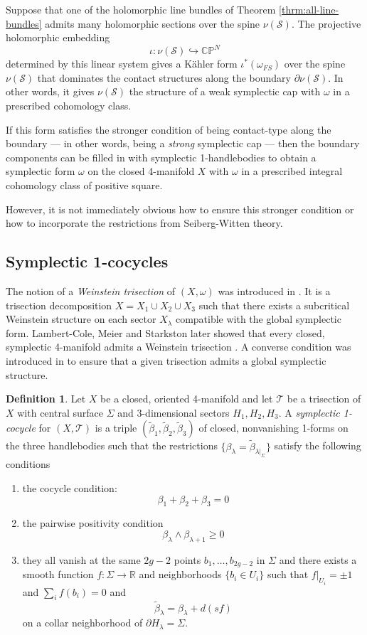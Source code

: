 \documentclass[11pt]{amsart}
\theoremstyle{definition}
\newtheorem{definition}[theorem]{Definition}
\theoremstyle{remark}
\numberwithin{equation}{section}
\newcommand{\betat}{\widetilde{\beta}}
\newcommand{\cT}{\mathcal{T}}
\newcommand{\cS}{\mathcal{S}}
\newcommand{\RR}{\mathbb{R}}
\newcommand{\CP}{\mathbb{CP}}
\newcommand{\del}{\partial}
\begin{document}
Suppose that one of the holomorphic line bundles of Theorem \ref{thrm:all-line-bundles} admits many holomorphic sections over the spine $\nu(\cS)$.  The projective holomorphic embedding 
\[\iota: \nu(\cS) \hookrightarrow \CP^N\]
determined by this linear system gives a K\"ahler form $\iota^*(\omega_{FS})$ over the spine $\nu(\cS)$ that dominates the contact structures along the boundary $\del \nu(\cS)$.  In other words, it gives $\nu(\cS)$ the structure of a weak symplectic cap with $\omega$ in a prescribed cohomology class.  

If this form satisfies the stronger condition of being contact-type along the boundary --- in other words, being a {\it strong} symplectic cap --- then the boundary components can be filled in with symplectic 1-handlebodies to obtain a symplectic form $\omega$ on the closed 4-manifold $X$ with $\omega$ in a prescribed integral cohomology class of positive square.

However, it is not immediately obvious how to ensure this stronger condition or how to incorporate the restrictions from Seiberg-Witten theory.

\subsection{Symplectic 1-cocycles}

The notion of a {\it Weinstein trisection} of $(X,\omega)$ was introduced in \cite{LM-Rational}.  It is a trisection decomposition $X = X_1 \cup X_2 \cup X_3$ such that there exists a subcritical Weinstein structure on each sector $X_{\lambda}$ compatible with the global symplectic form.  Lambert-Cole, Meier and Starkston later showed that every closed, symplectic 4-manifold admits a Weinstein trisection \cite{LMS}.  A converse condition was introduced in \cite{LC-symp-cocycle} to ensure that a given trisection admits a global symplectic structure.

\begin{definition}
\label{def:symp-1-cocycle}
    Let $X$ be a closed, oriented 4-manifold and let $\cT$ be a trisection of $X$ with central surface $\Sigma$ and 3-dimensional sectors $H_1,H_2,H_3$.  A {\it symplectic 1-cocycle} for $(X,\cT)$ is a triple $(\betat_1,\betat_2,\betat_3)$ of closed, nonvanishing 1-forms on the three handlebodies such that the restrictions $\{\beta_{\lambda} = \betat_{\lambda|_{\Sigma}} \}$ satisfy the following conditions 
    \begin{enumerate}
        \item the cocycle condition:
        \[ \beta_1 + \beta_2 + \beta_3 = 0\]
        \item the pairwise positivity condition
        \[\beta_{\lambda} \wedge \beta_{\lambda+1} \geq 0\]
        \item they all vanish at the same $2g-2$ points $b_1,\dots,b_{2g-2}$ in $\Sigma$ and there exists a smooth function $f: \Sigma \rightarrow \RR$ and neighborhoods $\{b_i \in U_i\}$ such that $f|_{U_i} = \pm 1$ and $\sum_i f(b_i) = 0$ and
        \[\betat_{\lambda} = \beta_{\lambda} + d(sf)\]
        on a collar neighborhood of $\partial H_{\lambda} = \Sigma$.
    \end{enumerate}
\end{definition}
\end{document}
